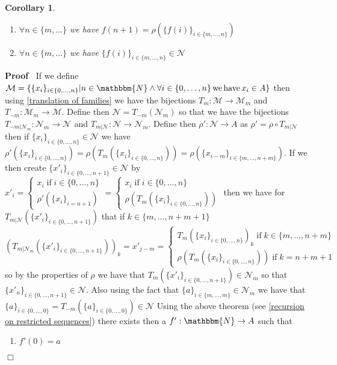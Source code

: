 \documentclass{book}
\newcommand{\tmop}[1]{\ensuremath{\operatorname{#1}}}
\newenvironment{proof}{\noindent\textbf{Proof\ }}{\hspace*{\fill}$\Box$\medskip}
\newtheorem{corollary}{Corollary}
\begin{document}
{{\begin{corollary}
\begin{enumerate}
    \item $\forall n \in \{ m, \ldots \}$ we have $f (n + 1) = \rho (\{ f (i)
    \}_{i \in \{ m, \ldots, n \}})$
    
    \item $\forall n \in \{ m, \ldots \}$ we have $\{ f (i) \}_{i \in \{ m,
    \ldots, n \}} \in \mathcal{N}$
  \end{enumerate}
\end{corollary}

\begin{proof}
  If we define $\mathcal{M}= \{ \{ x_i \}_{i \in \{ 0, \ldots, n \}} |n \in
  \mathbbm{N} \wedge \forall i \in \{ 0, \ldots, n \} \tmop{we} \tmop{have}
  x_i \in A \}$ then using \ref{translation of families} we have the
  bijections $T_m : \mathcal{M} \rightarrow \mathcal{M}_m$ and $T_{- m} :
  \mathcal{M}_m \rightarrow \mathcal{M}$. Define then $\mathcal{N}= T_{- m}
  (\mathcal{N}_m)$ so that we have the bijections $T_{- m|\mathcal{N}_m} :
  \mathcal{N}_m \rightarrow \mathcal{N}_{}$ and $T_{m|\mathcal{N}} :
  \mathcal{N} \rightarrow \mathcal{N}_m$. Define then $\rho' : \mathcal{N}
  \rightarrow A$ as $\rho' = \rho \circ T_{m|\mathcal{N}}$ then if $\{ x_i
  \}_{i \in \{ 0, \ldots, n \}} \in \mathcal{N}$ we have $\rho' (\{ x_i \}_{i
  \in \{ 0, \ldots, n \}}) = \rho (T_m (\{ x_i \}_{i \in \{ 0, \ldots, n \}}))
  = \rho (\{ x_{i - m} \}_{i \in \{ m, \ldots, n + m \}})$. If we then create
  $\{ x'_i \}_{i \in \{ 0, \ldots, n + 1 \}} \in \mathcal{N}$ by $x'_i =
  \left\{ \begin{array}{l}
    x_i \tmop{if} i \in \{ 0, \ldots, n \}\\
    \rho' (\{ x_i \}_{i = n + 1})
  \end{array} \right. = \left\{ \begin{array}{l}
    x_i \tmop{if} i \in \{ 0, \ldots, n \}\\
    \rho (T_m (\{ x_i \}_{i \in \{ 0, \ldots, n \}}))
  \end{array} \right.$ then we have for $T_{m|\mathcal{N}} (\{ x'_i \}_{i \in
  \{ 0, \ldots, n + 1 \}})$ that if $k \in \{ m, \ldots, n + m + 1 \}$ \
  $(T_{m|\mathcal{N}_m} (\{ x'_i \}_{i \in \{ 0, \ldots, n + 1 \}}))_k = x'_{j
  - m} = \left\{ \begin{array}{l}
    T_m (\{ x_i \}_{i \in \{ 0, \ldots, n \}})_k \tmop{if} k \in \{ m, \ldots,
    n + m \}\\
    \rho (T_m (\{ x_i \}_{i \in \{ 0, \ldots, n \}})) \tmop{if} k = n + m + 1
  \end{array} \right.$so by the properties of $\rho$ we have that $T_m (\{
  x'_i \}_{i \in \{ 0, \ldots, n + 1 \}}) \in \mathcal{N}_m$ so that $\{ x'_n
  \}_{i \in \{ 0, \ldots, n + 1 \}} \in \mathcal{N}$. Also using the fact that
  $\{ a \}_{i \in \{ m, \ldots, m \}} \in \mathcal{N}_m$ we have that $\{ a
  \}_{i \in \{ 0, \ldots, 0 \}} = T_{- m} (\{ a \}_{i \in \{ 0, \ldots, 0 \}})
  \in \mathcal{N}$ Using the above theorem (see \ref{recursion on restricted
  sequences}) there exists then a $f' : \mathbbm{N} \rightarrow A$ such that
  \begin{enumerate}
    \item $f' (0) = a$
    

\end{enumerate}
\end{proof}}}
\end{document}

